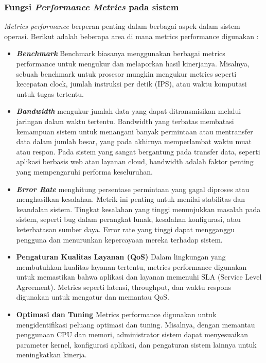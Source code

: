 \documentclass[12pt]{article}
\begin{document}
\subsubsection{Fungsi \textit{Performance Metrics} pada sistem}
\hspace*{1cm} \textit{Metrics performance} berperan penting dalam berbagai aspek dalam sistem operasi. Berikut adalah beberapa area di mana metrics performance digunakan :
\begin{itemize}
    \item  \textit{\textbf{Benchmark}} \newline \hspace*{1cm} Benchmark biasanya menggunakan berbagai metrics performance untuk mengukur dan melaporkan hasil kinerjanya. Misalnya, sebuah benchmark untuk prosesor mungkin mengukur metrics seperti kecepatan clock, jumlah instruksi per detik (IPS), atau waktu komputasi untuk tugas tertentu.
    \item  \textit{\textbf{Bandwidth}} \newline \hspace*{1cm} mengukur jumlah data yang dapat ditransmisikan melalui jaringan dalam waktu tertentu. Bandwidth yang terbatas membatasi kemampuan sistem untuk menangani banyak permintaan atau mentransfer data dalam jumlah besar, yang pada akhirnya memperlambat waktu muat atau respon. Pada sistem yang sangat bergantung pada transfer data, seperti aplikasi berbasis web atau layanan cloud, bandwidth adalah faktor penting yang mempengaruhi performa keseluruhan.
    \item  \textit{\textbf{Error Rate}} \newline \hspace*{1cm} menghitung persentase permintaan yang gagal diproses atau menghasilkan kesalahan. Metrik ini penting untuk menilai stabilitas dan keandalan sistem. Tingkat kesalahan yang tinggi menunjukkan masalah pada sistem, seperti bug dalam perangkat lunak, kesalahan konfigurasi, atau keterbatasan sumber daya. Error rate yang tinggi dapat mengganggu pengguna dan menurunkan kepercayaan mereka terhadap sistem.
    \item  \textbf{Pengaturan Kualitas Layanan (QoS)} \newline \hspace*{1cm} Dalam lingkungan yang membutuhkan kualitas layanan tertentu, metrics performance digunakan untuk memastikan bahwa aplikasi dan layanan memenuhi SLA (Service Level Agreement). Metrics seperti latensi, throughput, dan waktu respons digunakan untuk mengatur dan memantau QoS.
    \item  \textbf{Optimasi dan Tuning} \newline \hspace*{1cm} Metrics performance digunakan untuk mengidentifikasi peluang optimasi dan tuning. Misalnya, dengan memantau penggunaan CPU dan memori, administrator sistem dapat menyesuaikan parameter kernel, konfigurasi aplikasi, dan pengaturan sistem lainnya untuk meningkatkan kinerja.
\end{itemize}
\end{document}
